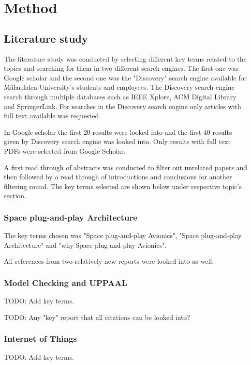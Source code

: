 \chapter{Method}\label{ch:method}
\section{Literature study}
The literature study was conducted by selecting different key terms related to
the topics and searching for them in two different search engines. The first
one was Google scholar and the second one was the "Discovery" search engine
available for Mälardalen University's students and employees. The Discovery
search engine search through multiple databases such as IEEE Xplore,
ACM Digital Library and SpringerLink. For searches in the Discovery search
engine only articles with full text available was requested.

In Google scholar the first 20 results were looked into and the first 40
results given by Discovery search engine was looked into. Only results with
full text PDFs were selected from Google Scholar.

A first read through of abstracts was conducted to filter out unrelated
papers and then followed by a read through of introductions and conclusions for
another filtering round. The key terms selected are shown below under
respective topic's section.

\subsection{Space plug-and-play Architecture}
The key terms chosen was "Space plug-and-play Avionics", "Space
plug-and-play Architecture" and "why Space plug-and-play Avionics".

All references from two relatively new reports were looked into as well.


\subsection{Model Checking and UPPAAL}
TODO: Add key terms.

TODO: Any "key" report that all citations can be looked into?

\subsection{Internet of Things}
TODO: Add key terms.

